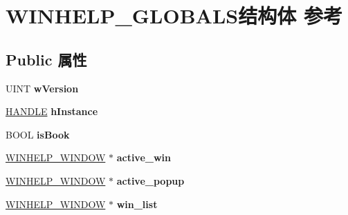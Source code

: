 \hypertarget{struct_w_i_n_h_e_l_p___g_l_o_b_a_l_s}{}\section{W\+I\+N\+H\+E\+L\+P\+\_\+\+G\+L\+O\+B\+A\+L\+S结构体 参考}
\label{struct_w_i_n_h_e_l_p___g_l_o_b_a_l_s}
\subsection*{Public 属性}
\begin{DoxyCompactItemize}
\item 
\mbox{\label{struct_w_i_n_h_e_l_p___g_l_o_b_a_l_s_a5891b7bd6e8365178066e6bc0831b80d}} 
U\+I\+NT {\bfseries w\+Version}
\item 
\mbox{\label{struct_w_i_n_h_e_l_p___g_l_o_b_a_l_s_a1b0861e68feb0bcaa29e75ac942b9cd0}} 
\hyperlink{interfacevoid}{H\+A\+N\+D\+LE} {\bfseries h\+Instance}
\item 
\mbox{\label{struct_w_i_n_h_e_l_p___g_l_o_b_a_l_s_af7f609832f0107082f289a38de22e9e0}} 
B\+O\+OL {\bfseries is\+Book}
\item 
\mbox{\label{struct_w_i_n_h_e_l_p___g_l_o_b_a_l_s_a9cfadb420fc1c437098a2bce7fcd2587}} 
\hyperlink{structtag_win_help}{W\+I\+N\+H\+E\+L\+P\+\_\+\+W\+I\+N\+D\+OW} $\ast$ {\bfseries active\+\_\+win}
\item 
\mbox{\label{struct_w_i_n_h_e_l_p___g_l_o_b_a_l_s_a44b40a324637b0a5a0dc3502f4574904}} 
\hyperlink{structtag_win_help}{W\+I\+N\+H\+E\+L\+P\+\_\+\+W\+I\+N\+D\+OW} $\ast$ {\bfseries active\+\_\+popup}
\item 
\mbox{\label{struct_w_i_n_h_e_l_p___g_l_o_b_a_l_s_aa1b2b7a0d75a6766275947c6bb347faa}} 
\hyperlink{structtag_win_help}{W\+I\+N\+H\+E\+L\+P\+\_\+\+W\+I\+N\+D\+OW} $\ast$ {\bfseries win\+\_\+list}
\item 
\mbox{\label{struct_w_i_n_h_e_l_p___g_l_o_b_a_l_s_a3d5d0b12576afe03aa82e71c162951d2}} 

\end{DoxyCompactItemize}
